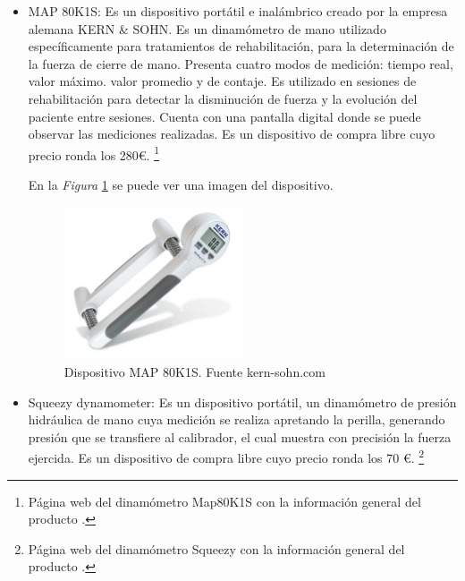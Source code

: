 \begin{itemize}
\begin{itemize}
    \item MAP 80K1S: Es un dispositivo portátil e inalámbrico creado por la empresa alemana KERN \& SOHN. Es un dinamómetro de mano utilizado específicamente para tratamientos de rehabilitación, para la determinación de la fuerza de cierre de mano.
    Presenta cuatro modos de medición: tiempo real, valor máximo. valor promedio y de contaje. 
    Es utilizado en sesiones de rehabilitación para detectar la disminución de fuerza y la evolución del paciente entre sesiones. Cuenta con una pantalla digital donde se puede observar las mediciones realizadas. 
    Es un dispositivo de compra libre cuyo precio ronda los 280€. \cite{Map80k1s}\footnote{Página web del dinamómetro Map80K1S con la información general del producto \cite{Map80k1s}.}
    
    En la \textit{Figura} \ref{fig:Dispositivo MAP 80K1S} se puede ver una imagen del dispositivo.
      \begin{figure}[h]
        \centering
        \includegraphics[width=0.5\textwidth]{img/MAP-80K1S.jpg}
        \caption{Dispositivo MAP 80K1S. Fuente kern-sohn.com}
        \label{fig:Dispositivo MAP 80K1S}
    \end{figure}
    
    \item Squeezy dynamometer: Es un dispositivo portátil, un dinamómetro de presión hidráulica de mano cuya medición se realiza apretando la perilla, generando presión que se transfiere al calibrador, el cual muestra con precisión la fuerza ejercida. Es un dispositivo de compra libre cuyo precio ronda los 70 €. \cite{SqueezeDinamometro}\footnote{Página web del dinamómetro Squeezy con la información general del producto \cite{SqueezeDinamometro}.} 
    

\end{itemize}
\end{itemize}

